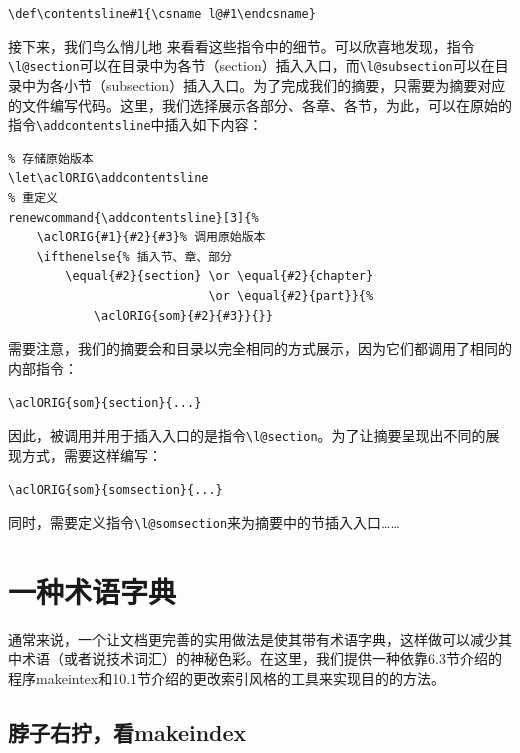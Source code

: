 \begin{dmd}
\verb|\def\contentsline#1{\csname l@#1\endcsname}|
\end{dmd}

接下来，我们鸟么悄{\footnotesize 儿}地%
来看看这些指令中的细节。可以欣喜地发现，指令\verb|\l@section|可以在目录中为各节（section）插入入口，而\verb|\l@subsection|可以在目录中为各小节（subsection）插入入口。为了完成我们的摘要，只需要为摘要对应的文件编写代码。这里，我们选择展示各部分、各章、各节，为此，可以在原始的指令\verb|\addcontentsline|中插入如下内容：

\begin{dmd}
\begin{verbatim}
% 存储原始版本
\let\aclORIG\addcontentsline
% 重定义
renewcommand{\addcontentsline}[3]{% 
    \aclORIG{#1}{#2}{#3}% 调用原始版本
    \ifthenelse{% 插入节、章、部分
        \equal{#2}{section} \or \equal{#2}{chapter} 
                            \or \equal{#2}{part}}{%
            \aclORIG{som}{#2}{#3}}{}}\end{verbatim}
\end{dmd}

\begin{exclamation}
需要注意，我们的摘要会和目录以完全相同的方式展示，因为它们都调用了相同的内部指令：

\begin{dmd}
\verb|\aclORIG{som}{section}{...}|
\end{dmd}

因此，被调用并用于插入入口的是指令\verb|\l@section|。为了让摘要呈现出不同的展现方式，需要这样编写：

\begin{dmd}
\verb|\aclORIG{som}{somsection}{...}|
\end{dmd}

同时，需要定义指令\verb|\l@somsection|来为摘要中的节插入入口……
\end{exclamation}

\section{一种术语字典}

通常来说，一个让文档更完善的实用做法是使其带有术语字典，这样做可以减少其中术语（或者说技术词汇）的神秘色彩。在这里，我们提供一种依靠6.3节介绍的程序\textsf{makeintex}和10.1节介绍的更改索引风格的工具来实现目的的方法。

\subsection{脖子右拧，看\textsf{makeindex}}

